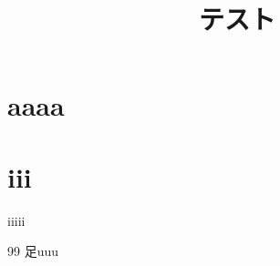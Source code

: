 \documentclass[a4j,epsf,twocolumn]{jarticle}
\title{テスト}
\begin{document}
    \section{aaaa}

    \section{iii}
        iiiii

    \begin{thebibliography}{99}
         足uuu
    \end{thebibliography}
\end{document}
